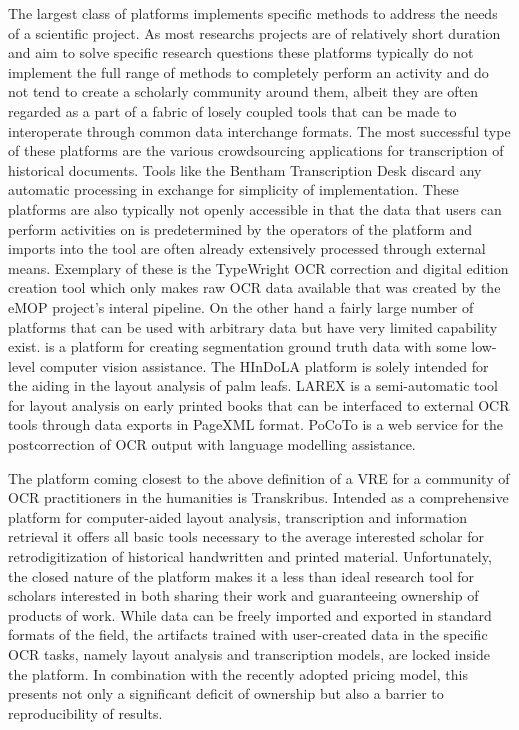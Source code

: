 The largest class of platforms implements specific methods to address the needs of
a scientific project. As most researchs projects are of relatively short
duration and aim to solve specific research questions these platforms typically
do not implement the full range of methods to completely perform an activity
and do not tend to create a scholarly community around them, albeit they are
often regarded as a part of a fabric of losely coupled tools that can be made
to interoperate through common data interchange formats. The most successful
type of these platforms are the various crowdsourcing applications for
transcription of historical documents. Tools like the Bentham Transcription
Desk\cite{moyle2011manuscript} discard any automatic processing in exchange for
simplicity of implementation. These platforms are also typically not openly
accessible in that the data that users can perform activities on is
predetermined by the operators of the platform and imports into the tool are
often already extensively processed through external means. Exemplary of these
is the TypeWright OCR correction and digital edition creation
tool\cite{typewright} which only makes raw OCR data available that was created
by the eMOP project's interal pipeline. On the other hand a fairly large number
of platforms that can be used with arbitrary data but have very limited
capability exist. \cite{webaletheia} is a platform for creating segmentation
ground truth data with some low-level computer vision assistance. The
HInDoLA\cite{trivedi2019hindola} platform is solely intended for the aiding in
the layout analysis of palm leafs. LAREX \cite{reul2017larex} is a
semi-automatic tool for layout analysis on early printed books that can be
interfaced to external OCR tools through data exports in PageXML format. PoCoTo
\cite{vobl2014pocoto} is a web service for the postcorrection of OCR output
with language modelling assistance.

The platform coming closest to the above definition of a VRE for a community of
OCR practitioners in the humanities is Transkribus\cite{kahle2017transkribus}.
Intended as a comprehensive platform for computer-aided layout analysis,
transcription and information retrieval it offers all basic tools necessary to
the average interested scholar for retrodigitization of historical handwritten
and printed material. Unfortunately, the closed nature of the platform makes it
a less than ideal research tool for scholars interested in both sharing their
work and guaranteeing ownership of products of work. While data can be freely
imported and exported in standard formats of the field, the artifacts trained
with user-created data in the specific OCR tasks, namely layout analysis and
transcription models, are locked inside the platform. In combination with the
recently adopted pricing model, this presents not only a significant deficit of
ownership but also a barrier to reproducibility of results.

